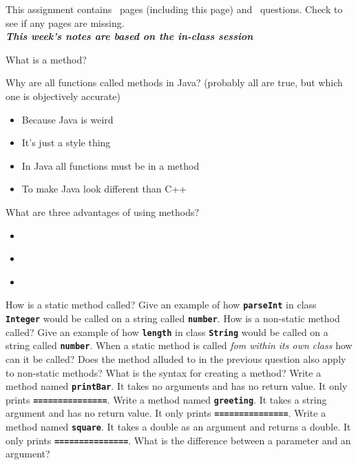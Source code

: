 \documentclass[letterpaper,11pt]{exam}
\newcommand{\videoheading}[1]{\Large\textbf{\textit{#1}}}
\begin{document}
This assignment contains \numpages\ pages (including this page) and
\numquestions\ questions.  Check to see if any pages are missing.\\
\videoheading{This week's notes are based on the in-class session}
\begin{questions}

\question What is a method?
\vspace{2cm}

\question Why are all functions called methods in Java? (probably all are true, but which one is objectively accurate)
\begin{itemize}
  \item Because Java is weird 
  \item It's just a style thing
  \item In Java all functions must be in a method
  \item To make Java look different than C++
\end{itemize}

\question What are three advantages of using methods?
\begin{itemize}
  \item ~
  \item ~
  \item ~
\end{itemize}

\question How is a static method called?
\vspace{1cm}
\question Give an example of how \texttt{\textbf{parseInt}} in class \texttt{\textbf{Integer}} would be called on a string called \texttt{\textbf{number}}.
\question How is a non-static method called?
\question Give an example of how \texttt{\textbf{length}} in class \texttt{\textbf{String}} would be called on a string called \texttt{\textbf{number}}.
\question When a static method is called \textit{fom within its own class} how can it be called?  
\vspace{1cm}
\question Does the method alluded to in the previous question also apply to non-static methods?
\vspace{1cm}
\question What is the syntax for creating a method?
\vspace{1cm}
\question Write a method named \texttt{\textbf{printBar}}.  It takes no arguments and has no return value.  It only prints \texttt{\textbf{===============}}.
\vspace{4cm}
\question Write a method named \texttt{\textbf{greeting}}.  It takes a string argument and has no return value.  It only prints \texttt{\textbf{===============}}.
\vspace{4cm}
\question Write a method named \texttt{\textbf{square}}.  It takes a double as an argument and returns a double.  It only prints \texttt{\textbf{===============}}.
\vspace{4cm}
\question What is the difference between a parameter and an argument?


\end{questions}
\end{document}

